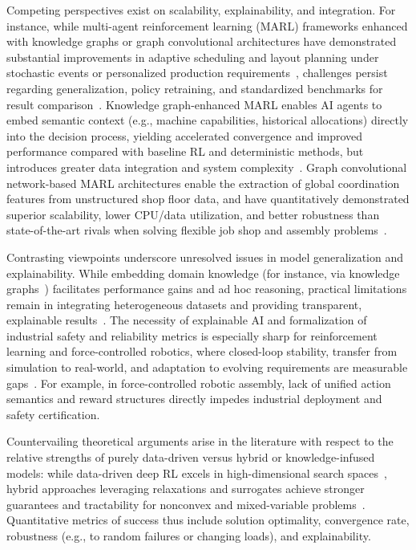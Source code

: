 \documentclass[sigconf]{acmart}
\begin{document}
Competing perspectives exist on scalability, explainability, and integration. For instance, while multi-agent reinforcement learning (MARL) frameworks enhanced with knowledge graphs or graph convolutional architectures have demonstrated substantial improvements in adaptive scheduling and layout planning under stochastic events or personalized production requirements~\cite{ref13,ref14,ref45}, challenges persist regarding generalization, policy retraining, and standardized benchmarks for result comparison~\cite{ref13,ref14,ref56}. Knowledge graph-enhanced MARL enables AI agents to embed semantic context (e.g., machine capabilities, historical allocations) directly into the decision process, yielding accelerated convergence and improved performance compared with baseline RL and deterministic methods, but introduces greater data integration and system complexity~\cite{ref13,ref44}. Graph convolutional network-based MARL architectures enable the extraction of global coordination features from unstructured shop floor data, and have quantitatively demonstrated superior scalability, lower CPU/data utilization, and better robustness than state-of-the-art rivals when solving flexible job shop and assembly problems~\cite{ref14,ref45}.

Contrasting viewpoints underscore unresolved issues in model generalization and explainability. While embedding domain knowledge (for instance, via knowledge graphs~\cite{ref13,ref44}) facilitates performance gains and ad hoc reasoning, practical limitations remain in integrating heterogeneous datasets and providing transparent, explainable results~\cite{ref44,ref41,ref38}. The necessity of explainable AI and formalization of industrial safety and reliability metrics is especially sharp for reinforcement learning and force-controlled robotics, where closed-loop stability, transfer from simulation to real-world, and adaptation to evolving requirements are measurable gaps~\cite{ref56}. For example, in force-controlled robotic assembly, lack of unified action semantics and reward structures directly impedes industrial deployment and safety certification.

Countervailing theoretical arguments arise in the literature with respect to the relative strengths of purely data-driven versus hybrid or knowledge-infused models: while data-driven deep RL excels in high-dimensional search spaces~\cite{ref13,ref14}, hybrid approaches leveraging relaxations and surrogates achieve stronger guarantees and tractability for nonconvex and mixed-variable problems~\cite{ref71,ref73,ref76}. Quantitative metrics of success thus include solution optimality, convergence rate, robustness (e.g., to random failures or changing loads), and explainability.
\end{document}
